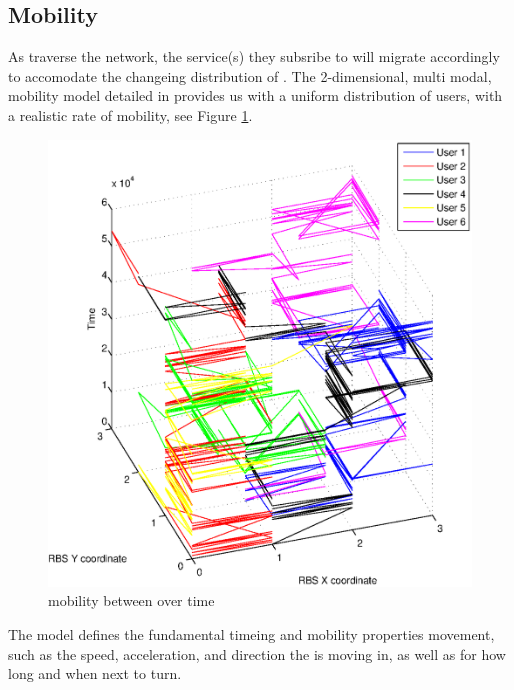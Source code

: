\subsection{Mobility}
As \ues traverse the \xcloud network, the service(s) they subsribe to will migrate accordingly to accomodate the changeing distribution of \ues. The 2-dimensional, multi modal, mobility model detailed in \cite{bettstetter2001smooth} provides us with a uniform distribution of users, with a realistic rate of mobility, see Figure \ref{fig:mobility_distribution}.

\begin{figure}[tb]
	\centering
	\includegraphics[width=\linewidth]{user_mobility.eps} 
	\caption{\Ue mobility between \rbs over time}
	\label{fig:mobility_distribution}
\end{figure}

The model defines the fundamental timeing and mobility properties \ue movement, such as the speed, acceleration, and direction the \ue is moving in, as well as for how long and when next to turn. 